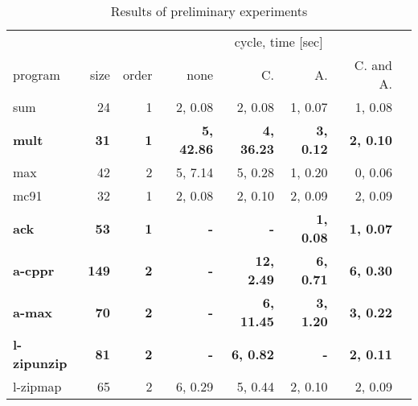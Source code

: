 \begin{table}
\caption{Results of preliminary experiments}
\label{tbl:exp}
\begin{center}
\begin{tabular}{|l|r|r|r|r|r|r|r|}
\hline
            &       &    & \multicolumn{4}{|c|}{cycle, time [sec]} \\
\cline{4-7}
program    & size & order & none &     C. &   A. &    C. and A. \\
\hline
 sum        &    24&      1& 2,  0.08 & 2,  0.08 & 1,  0.07 & 1,  0.08 \\
\bf mult       &\bf    31&\bf      1&\bf 5, 42.86 &\bf 4, 36.23 &\bf 3,  0.12 &\bf 2,  0.10 \\
 max        &    42&      2& 5,  7.14 & 5,  0.28 & 1,  0.20 & 0,  0.06 \\
 mc91       &    32&      1& 2,  0.08 & 2,  0.10 & 2,  0.09 & 2,  0.09 \\
\bf ack        &\bf    53&\bf      1&\bf        - &\bf        - &\bf 1,  0.08 &\bf 1,  0.07 \\
\bf a-cppr     &\bf   149&\bf      2&\bf        - &\bf 12, 2.49 &\bf 6,  0.71 &\bf 6,  0.30 \\
\bf a-max      &\bf    70&\bf      2&\bf        - &\bf 6, 11.45 &\bf 3,  1.20 &\bf 3,  0.22 \\
\bf l-zipunzip &\bf    81&\bf      2&\bf        - &\bf 6,  0.82 &\bf        - &\bf 2,  0.11 \\
 l-zipmap   &    65&      2& 6,  0.29 & 5,  0.44 & 2,  0.10 & 2,  0.09 \\

\end{tabular}
\end{center}
\end{table}
